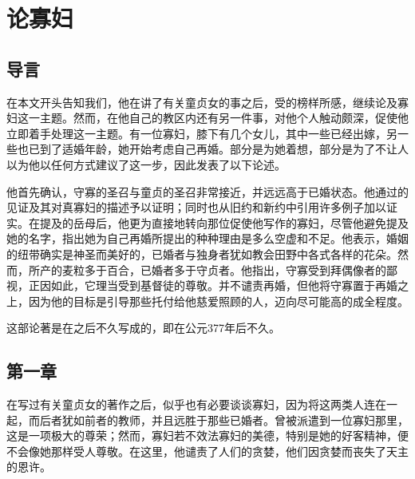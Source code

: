 
\chapter{论寡妇}



\section{导言}

在本文开头告知我们，他在讲了有关童贞女的事之后，受的榜样所感，继续论及寡妇这一主题。然而，在他自己的教区内还有另一件事，对他个人触动颇深，促使他立即着手处理这一主题。有一位寡妇，膝下有几个女儿，其中一些已经出嫁，另一些也已到了适婚年龄，她开始考虑自己再婚。部分是为她着想，部分是为了不让人以为他以任何方式建议了这一步，因此发表了以下论述。\par

他首先确认，守寡的圣召与童贞的圣召非常接近，并远远高于已婚状态。他通过的见证及其对真寡妇的描述予以证明；同时也从旧约和新约中引用许多例子加以证实。在提及的岳母后，他更为直接地转向那位促使他写作的寡妇，尽管他避免提及她的名字，指出她为自己再婚所提出的种种理由是多么空虚和不足。他表示，婚姻的纽带确实是神圣而美好的，已婚者与独身者犹如教会田野中各式各样的花朵。然而，所产的麦粒多于百合，已婚者多于守贞者。他指出，守寡受到拜偶像者的鄙视，正因如此，它理当受到基督徒的尊敬。并不谴责再婚，但他将守寡置于再婚之上，因为他的目标是引导那些托付给他慈爱照顾的人，迈向尽可能高的成全程度。\par

这部论著是在之后不久写成的，即在公元377年后不久。\par


\section{第一章}

在写过有关童贞女的著作之后，似乎也有必要谈谈寡妇，因为将这两类人连在一起，而后者犹如前者的教师，并且远胜于那些已婚者。曾被派遣到一位寡妇那里，这是一项极大的尊荣；然而，寡妇若不效法寡妇的美德，特别是她的好客精神，便不会像她那样受人尊敬。在这里，他谴责了人们的贪婪，他们因贪婪而丧失了天主的恩许。\par

